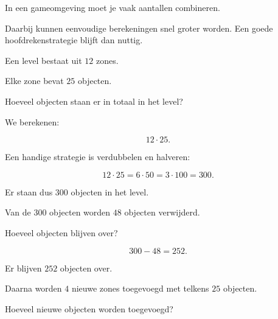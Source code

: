 \documentclass{ximera}
\begin{document}


In een gameomgeving moet je vaak aantallen combineren.

Daarbij kunnen eenvoudige berekeningen snel groter worden.
Een goede hoofdrekenstrategie blijft dan nuttig.


\begin{oefening}{\oefU\ESS}

Een level bestaat uit \(12\) zones.

Elke zone bevat \(25\) objecten.

\begin{question}

Hoeveel objecten staan er in totaal in het level?

\begin{oplossing}

We berekenen:

\[
12\cdot25.
\]

Een handige strategie is verdubbelen en halveren:

\[
12\cdot25
=
6\cdot50
=
3\cdot100
=
300.
\]

Er staan dus \(300\) objecten in het level.

\end{oplossing}

\end{question}


\begin{question}

Van de \(300\) objecten worden \(48\) objecten verwijderd.

Hoeveel objecten blijven over?

\begin{oplossing}

\[
300-48=252.
\]

Er blijven \(252\) objecten over.

\end{oplossing}

\end{question}


\begin{question}

Daarna worden \(4\) nieuwe zones toegevoegd met telkens \(25\) objecten.

Hoeveel nieuwe objecten worden toegevoegd?


\end{question}
\end{oefening}
\end{document}
